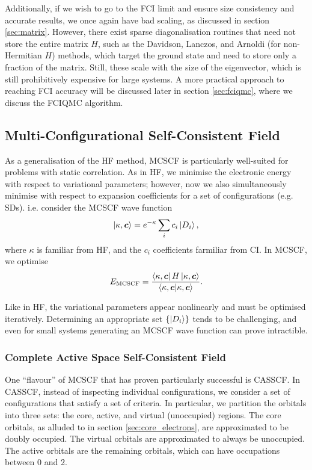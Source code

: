 Additionally, if we wish to go to the \gls{FCI} limit and ensure size consistency and accurate results, we once again have bad scaling, as discussed in section \ref{sec:matrix}. However, there exist sparse diagonalisation routines that need not store the entire matrix $H$, such as the Davidson,\cite{davidsonIterative1975} Lanczos,\cite{lanczosIteration1950} and Arnoldi\cite{arnoldiPrinciple1951} (for non-Hermitian $H$) methods, which target the ground state and need to store only a fraction of the matrix. Still, these scale with the size of the eigenvector, which is still prohibitively expensive for large systems. A more practical approach to reaching \gls{FCI} accuracy will be discussed later in section \ref{sec:fciqmc}, where we discuss the \gls{FCIQMC} algorithm.

\subsection{Multi-Configurational Self-Consistent Field}

As a generalisation of the \gls{HF} method, \gls{MCSCF} is particularly well-suited for problems with static correlation.\cite{helgakerMolecular2014,eadeDirect1981,roosNew1972} As in \gls{HF}, we minimise the electronic energy with respect to variational parameters; however, now we also simultaneously minimise with respect to expansion coefficients for a set of configurations (e.g. \glspl{SD}). i.e. consider the MCSCF wave function
\begin{equation}
\ket{\kappa,\bm c} = e^{-\kappa}\sum_ic_i\ket{D_i},
\end{equation}
where $\kappa$ is familiar from HF, and the $c_i$ coefficients farmiliar from \gls{CI}. In MCSCF, we optimise
\begin{equation}
E_\mathrm{MCSCF} = \frac{\bra{\kappa,\bm c}H\ket{\kappa,\bm c}}{\bra{\kappa,\bm c}\ket{\kappa,\bm c}}.
\end{equation}

Like in HF, the variational parameters appear nonlinearly and must be optimised iteratively. Determining an appropriate set $\{\ket{D_i}\}$ tends to be challenging, and even for small systems generating an MCSCF wave function can prove intractible.

\subsubsection{Complete Active Space Self-Consistent Field}
One ``flavour'' of \gls{MCSCF} that has proven particularly successful is \gls{CASSCF}.\cite{olsenCASSCF2011,roosComplete1980,siegbahnComparison1980,siegbahnComplete1981} In CASSCF, instead of inspecting individual configurations, we consider a set of configurations that satisfy a set of criteria. In particular, we partition the orbitals into three sets: the core, active, and virtual (unoccupied) regions. The core orbitals, as alluded to in section \ref{sec:core_electrons}, are approximated to be doubly occupied. The virtual orbitals are approximated to always be unoccupied. The active orbitals are the remaining orbitals, which can have occupations between 0 and 2.

